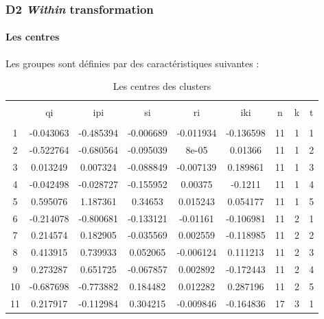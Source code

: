 \documentclass[11pt,]{article}
\let\oldparagraph\paragraph
\renewcommand{\paragraph}[1]{\oldparagraph{#1}\mbox{}}
\begin{document}
\FloatBarrier

\hypertarget{d2-within-transformation}{%
\subsubsection{\texorpdfstring{D2 \emph{Within}
transformation}{D2 Within transformation}}\label{d2-within-transformation}}

\hypertarget{les-centres}{%
\paragraph{Les centres}\label{les-centres}}

Les groupes sont définies par des caractéristiques suivantes :

\FloatBarrier

\begin{table}[!htbp] \centering 
  \caption{Les centres des clusters} 
  \label{} 
\begin{tabular}{@{\extracolsep{5pt}} ccccccccc} 
\\[-1.8ex]\hline 
\hline \\[-1.8ex] 
 & qi & ipi & si & ri & iki & n & k & t \\ 
\hline \\[-1.8ex] 
1 & -0.043063 & -0.485394 & -0.006689 & -0.011934 & -0.136598 & 11 & 1 & 1 \\ 
2 & -0.522764 & -0.680564 & -0.095039 & 8e-05 & 0.01366 & 11 & 1 & 2 \\ 
3 & 0.013249 & 0.007324 & -0.088849 & -0.007139 & 0.189861 & 11 & 1 & 3 \\ 
4 & -0.042498 & -0.028727 & -0.155952 & 0.00375 & -0.1211 & 11 & 1 & 4 \\ 
5 & 0.595076 & 1.187361 & 0.34653 & 0.015243 & 0.054177 & 11 & 1 & 5 \\ 
6 & -0.214078 & -0.800681 & -0.133121 & -0.01161 & -0.106981 & 11 & 2 & 1 \\ 
7 & 0.214574 & 0.182905 & -0.035569 & 0.002559 & -0.118985 & 11 & 2 & 2 \\ 
8 & 0.413915 & 0.739933 & 0.052065 & -0.006124 & 0.111213 & 11 & 2 & 3 \\ 
9 & 0.273287 & 0.651725 & -0.067857 & 0.002892 & -0.172443 & 11 & 2 & 4 \\ 
10 & -0.687698 & -0.773882 & 0.184482 & 0.012282 & 0.287196 & 11 & 2 & 5 \\ 
11 & 0.217917 & -0.112984 & 0.304215 & -0.009846 & -0.164836 & 17 & 3 & 1 \\ 

\end{tabular}
\end{table}
\end{document}
